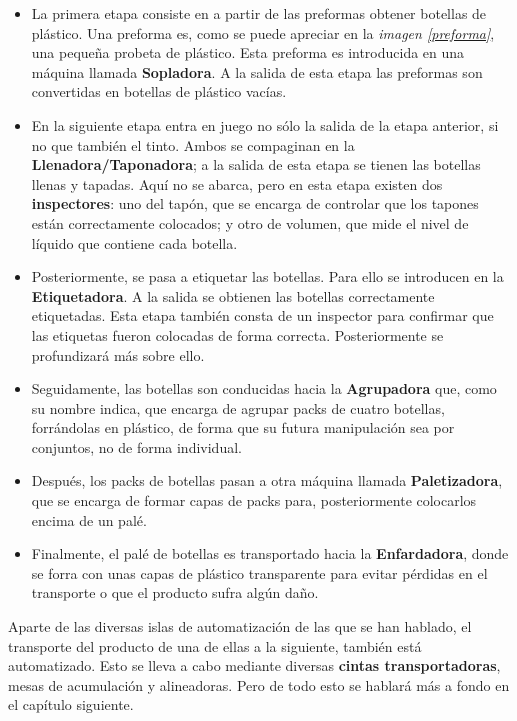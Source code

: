 \documentclass[11pt,a4paper,spanish,twoside]{report}
\begin{document}
\begin{itemize}
\item La primera etapa consiste en a partir de las preformas obtener botellas 
de plástico. Una preforma es, como se puede apreciar en la \emph{imagen  
\ref{preforma}}, una pequeña probeta de plástico. Esta preforma es
introducida en una máquina llamada \textbf{Sopladora}. A la salida de esta 
etapa las preformas son convertidas en botellas de plástico vacías.

\item En la siguiente etapa entra en juego no sólo la salida de la etapa
  anterior, si no que también el tinto. Ambos se compaginan en la
  \textbf{Llenadora/Taponadora}; a la salida de esta etapa se tienen las
  botellas llenas y tapadas. Aquí no se abarca, pero en esta etapa existen dos
\textbf{inspectores}: uno del tapón, que se encarga de controlar que los 
tapones están correctamente colocados; y otro de volumen, que mide el nivel de
líquido que contiene cada botella.

\item Posteriormente, se pasa a etiquetar las botellas. Para ello se 
introducen en la \textbf{Etiquetadora}. A la salida se obtienen las botellas
correctamente etiquetadas. Esta etapa también consta de un inspector para 
confirmar que las etiquetas fueron colocadas de forma correcta. Posteriormente
se profundizará más sobre ello.

\item Seguidamente, las botellas son conducidas hacia la \textbf{Agrupadora}
  que, como su nombre indica, que encarga de agrupar packs de cuatro 
bo\-te\-llas, forrándolas en plástico, de forma que su futura manipulación sea
por conjuntos, no de forma individual.

\item Después, los packs de botellas pasan a otra máquina llamada
  \textbf{Paletizadora}, que se encarga de formar capas de packs para,
posteriormente colocarlos encima de un palé.

\item Finalmente, el palé de botellas es transportado hacia la 
\textbf{Enfardadora}, donde se forra con unas capas de plástico transparente 
para evitar pérdidas en el transporte o que el producto sufra algún daño.

\end{itemize}
Aparte de las diversas islas de automatización de las que se han hablado, el
transporte del producto de una de ellas a la siguiente, también está 
au\-to\-ma\-ti\-za\-do. Esto se lleva a cabo mediante diversas \textbf{cintas 
transportadoras}, mesas de acumulación y alineadoras. Pero de todo esto se 
hablará más a fondo en el capítulo siguiente. 
\end{document}

